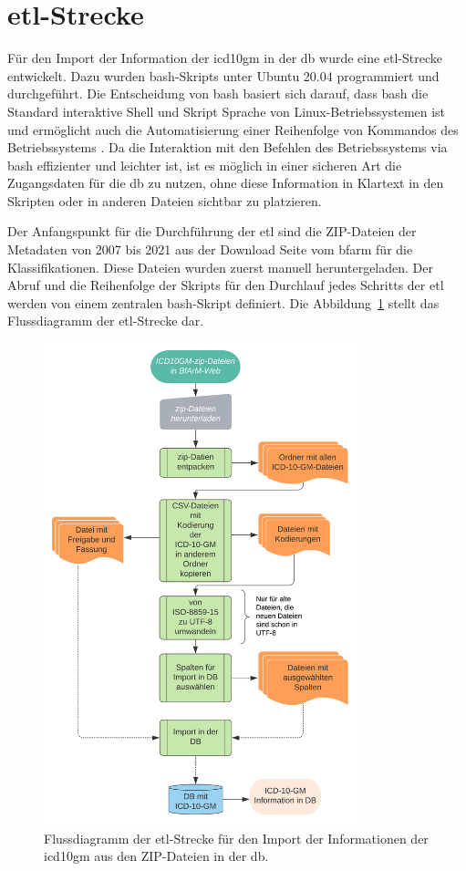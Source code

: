 \section{\acs{etl}-Strecke} \label{sec:etlpipeline}

Für den Import der Information der \ac{icd10gm} in der \ac{db} wurde eine \ac{etl}-Strecke entwickelt. Dazu wurden \ac{bash}-Skripts unter Ubuntu 20.04 programmiert und durchgeführt. Die Entscheidung von \ac{bash} basiert sich darauf, dass \ac{bash} die Standard interaktive Shell und Skript Sprache von Linux-Betriebssystemen ist und ermöglicht auch die Automatisierung einer Reihenfolge von Kommandos des Betriebssystems \cite{bash}. Da die Interaktion mit den Befehlen des Betriebssystems via \ac{bash} effizienter und leichter ist, ist es möglich in einer sicheren Art die Zugangsdaten für die \ac{db} zu nutzen, ohne diese Information in Klartext in den Skripten oder in anderen Dateien sichtbar zu platzieren.

Der Anfangspunkt für die Durchführung der \ac{etl} sind die ZIP-Dateien der Metadaten von 2007 bis 2021 aus der Download Seite vom \ac{bfarm} für die Klassifikationen. Diese Dateien wurden zuerst manuell heruntergeladen. Der Abruf und die Reihenfolge der Skripts für den Durchlauf jedes Schritts der \ac{etl} werden von einem zentralen \ac{bash}-Skript definiert. Die Abbildung~\ref{fig:etl} stellt das Flussdiagramm der \ac{etl}-Strecke dar.

\clearpage
\begin{figure}[ht]
	\centering
	\includegraphics[height=14cm]{figures/etl}
	\caption[\acs{etl}-Strecke]{Flussdiagramm der \acs{etl}-Strecke für den Import der Informationen der \ac{icd10gm} aus den ZIP-Dateien in der \ac{db}.}
	\label{fig:etl}
\end{figure} 

